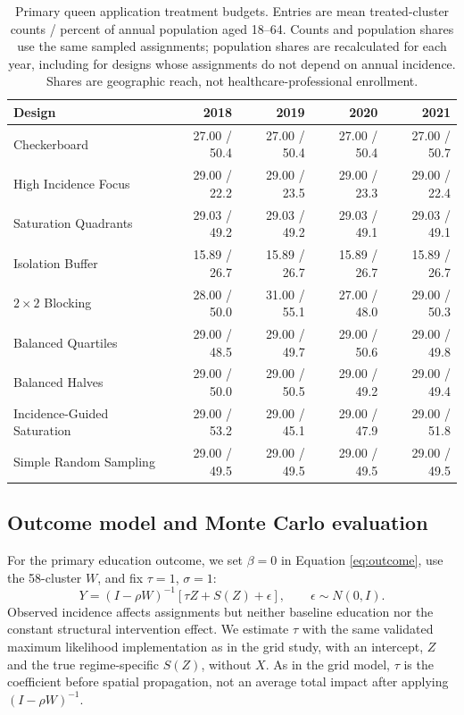 \documentclass[11pt]{article}
\begin{document}
\begin{table}[!htb]
\small
\centering

\caption{Primary queen application treatment budgets. Entries are mean treated-cluster counts / percent of annual population aged 18--64. Counts and population shares use the same sampled assignments; population shares are recalculated for each year, including for designs whose assignments do not depend on annual incidence. Shares are geographic reach, not healthcare-professional enrollment.}
\label{tab:nc-budgets}

\begin{tabular}{p{4.1cm}rrrr}
\toprule
Design & 2018 & 2019 & 2020 & 2021 \\
\midrule
Checkerboard & 27.00 / 50.4 & 27.00 / 50.4 & 27.00 / 50.4 & 27.00 / 50.7 \\
High Incidence Focus & 29.00 / 22.2 & 29.00 / 23.5 & 29.00 / 23.3 & 29.00 / 22.4 \\
Saturation Quadrants & 29.03 / 49.2 & 29.03 / 49.2 & 29.03 / 49.1 & 29.03 / 49.1 \\
Isolation Buffer & 15.89 / 26.7 & 15.89 / 26.7 & 15.89 / 26.7 & 15.89 / 26.7 \\
$2\times2$ Blocking & 28.00 / 50.0 & 31.00 / 55.1 & 27.00 / 48.0 & 29.00 / 50.3 \\
Balanced Quartiles & 29.00 / 48.5 & 29.00 / 49.7 & 29.00 / 50.6 & 29.00 / 49.8 \\
Balanced Halves & 29.00 / 50.0 & 29.00 / 50.5 & 29.00 / 49.2 & 29.00 / 49.4 \\
Incidence-Guided Saturation & 29.00 / 53.2 & 29.00 / 45.1 & 29.00 / 47.9 & 29.00 / 51.8 \\
Simple Random Sampling & 29.00 / 49.5 & 29.00 / 49.5 & 29.00 / 49.5 & 29.00 / 49.5 \\

\bottomrule
\end{tabular}
\end{table}

\subsection{Outcome model and Monte Carlo
evaluation}\label{outcome-model-and-monte-carlo-evaluation}

For the primary education outcome, we set \(\beta=0\) in Equation
\ref{eq:outcome}, use the 58-cluster \(W\), and fix \(\tau=1\),
\(\sigma=1\): \begin{equation}
Y=(I-\rho W)^{-1}[\tau Z+S(Z)+\epsilon],\qquad \epsilon\sim N(0,I).
\label{eq:nc-education}
\end{equation} Observed incidence affects assignments but neither
baseline education nor the constant structural intervention effect. We estimate $\tau$ with the same validated maximum likelihood implementation as in the grid study, with an intercept, \(Z\)
and the true regime-specific \(S(Z)\), without \(X\). As in the grid
model, \(\tau\) is the coefficient before spatial propagation, not an
average total impact after applying \((I-\rho W)^{-1}\).
\end{document}
